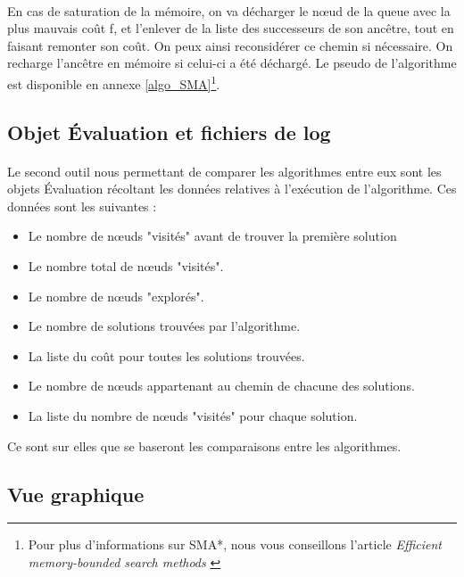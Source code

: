 \documentclass[pidr]{tnreport}
\begin{document}
\paragraph{}	
En cas de saturation de la mémoire, on va décharger le nœud de la queue avec la plus mauvais coût f, et l'enlever de la liste des successeurs de son ancêtre, tout en faisant remonter son coût. On peux ainsi reconsidérer ce chemin si nécessaire. On recharge l'ancêtre en mémoire si celui-ci a été déchargé.
\newline\newline
Le pseudo de l'algorithme est disponible en annexe \ref{algo_SMA}\footnote{Pour plus d'informations sur SMA*, nous vous conseillons l'article \textit{Efficient memory-bounded search methods} \cite{Russell-ecai92}}.

		\subsection{Objet Évaluation et fichiers de log}
\paragraph{}
Le second outil nous permettant de comparer les algorithmes entre eux sont les objets Évaluation récoltant les données relatives à l'exécution de l'algorithme. Ces données sont les suivantes :

\begin{itemize}
	
	\item Le nombre de nœuds "visités" avant de trouver la première solution
	\item Le nombre total de nœuds "visités".
	\item Le nombre de nœuds "explorés".
	\item Le nombre de solutions trouvées par l'algorithme.
	\item La liste du coût pour toutes les solutions trouvées.
	\item Le nombre de nœuds appartenant au chemin de chacune des solutions.
	\item La liste du nombre de nœuds "visités" pour chaque solution.

\end{itemize}

Ce sont sur elles que se baseront les comparaisons entre les algorithmes. 		
		
		\subsection{Vue graphique}		
		
\end{document}
